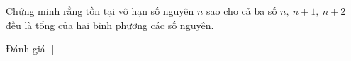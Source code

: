 \ifshowproblem
\begin{problem}\label{problem:THA-2015-TSTST-E-P1}
    Chứng minh rằng tồn tại vô hạn số nguyên \( n \) sao cho cả ba số \( n,\ n + 1,\ n + 2 \) đều là tổng của hai bình phương các số nguyên.
\end{problem}
\fi

\ifshowinfo
Đánh giá [\textbf{}]\footnotemark
{}
\fi